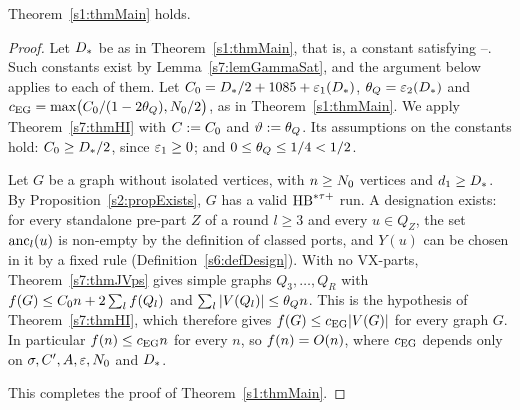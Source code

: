\begin{corollary}\label{s7:thmMainProof}
Theorem~\ref{s1:thmMain} holds.
\deps{\ref{s7:thmHI}, \ref{s7:thmJVps}, \ref{s2:propExists}, \ref{s7:lemGammaSat}, \ref{s6:defDesign}, \ref{s1:condGamma}, \ref{s1:defConstants}}
\end{corollary}

\begin{proof}
Let $D_{*}$ be as in Theorem~\ref{s1:thmMain}, that is, a constant satisfying
--. Such constants exist by Lemma~\ref{s7:lemGammaSat}, and the
argument below applies to each of them. Let
$C_{0}=D_{*}/2+1085+\varepsilon_{1}(D_{*})$, $\theta_{Q}=\varepsilon_{2}(D_{*})$ and
$c_{\mathrm{EG}}=\max\bigl(C_{0}/(1-2\theta_{Q}),N_{0}/2\bigr)$, as in
Theorem~\ref{s1:thmMain}. We apply Theorem~\ref{s7:thmHI} with $C\mathrel{:=}C_{0}$
and $\vartheta\mathrel{:=}\theta_{Q}$. Its assumptions on the constants hold:
$C_{0}\ge D_{*}/2$, since $\varepsilon_{1}\ge0$; and $0\le\theta_{Q}\le1/4<1/2$.

Let $G$ be a graph without isolated vertices, with $n\ge N_{0}$ vertices and
$d_1\ge D_{*}$. By Proposition~\ref{s2:propExists}, $G$ has a valid $\mathrm{HB}^{*\tau{+}}$
run. A designation exists: for every standalone pre-part $Z$ of a round $l\ge3$
and every $u\in Q_Z$, the set $\mathrm{anc}_l(u)$ is non-empty by the definition of
classed ports, and $Y(u)$ can be chosen in it by a fixed rule
(Definition~\ref{s6:defDesign}). With no VX-parts, Theorem~\ref{s7:thmJVps} gives
simple graphs $Q_3,\dots,Q_R$ with $f(G)\le C_{0} n+2\sum_lf(Q_l)$ and
$\sum_l|V(Q_l)|\le\theta_{Q} n$. This is the hypothesis of
Theorem~\ref{s7:thmHI}, which therefore gives $f(G)\le c_{\mathrm{EG}}|V(G)|$ for every
graph $G$. In particular $f(n)\le c_{\mathrm{EG}} n$ for every $n$, so $f(n)=O(n)$, where
$c_{\mathrm{EG}}$ depends only on $\sigma,C',A,\varepsilon,N_{0}$ and $D_{*}$.

This completes the proof of Theorem~\ref{s1:thmMain}.
\end{proof}

